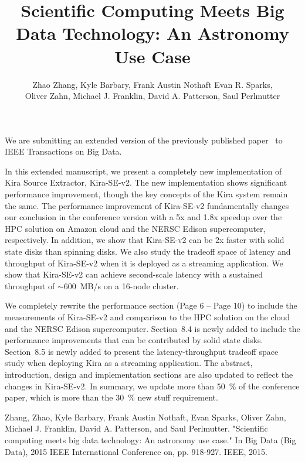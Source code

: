 \documentclass[10pt,a4paper]{article}
\title{Scientific Computing Meets Big Data Technology: An Astronomy Use Case}
\author{Zhao Zhang, Kyle Barbary, Frank Austin Nothaft Evan R. Sparks, \\Oliver Zahn, Michael J. Franklin, David A. Patterson, Saul Perlmutter}
\begin{document}
\maketitle
\noindent We are submitting an extended version of the previously published paper~\cite{lamport94} to IEEE Transactions on Big Data.

In this extended manuscript, we present a completely new implementation of Kira Source Extractor, Kira-SE-v2.
The new implementation shows significant performance improvement, though the key concepts of the Kira system remain the same.
The performance improvement of Kira-SE-v2 fundamentally changes our conclusion in the conference version with 
a 5x and 1.8x speedup over the HPC solution on Amazon cloud and the NERSC Edison supercomputer, respectively.
In addition, we show that Kira-SE-v2 can be 2x faster with solid state disks than spinning disks.
We also study the tradeoff space of latency and throughput of Kira-SE-v2 when it is deployed as a streaming application.
We show that Kira-SE-v2 can achieve second-scale latency with a sustained throughput of $\sim$600~MB/s on a 16-node cluster.

We completely rewrite the performance section (Page 6 -- Page 10) to include the measurements of Kira-SE-v2 and comparison
to the HPC solution on the cloud and the NERSC Edison supercomputer.
Section~8.4 is newly added to include the performance improvements that can be contributed by solid state disks.
Section~8.5 is newly added to present the latency-throughput tradeoff space study when deploying Kira as a streaming application.
The abstract, introduction, design and implementation sections are also updated to reflect the changes in Kira-SE-v2.
In summary, we update more than 50~\% of the conference paper, which is more than the 30~\% new stuff requirement.


\begin{thebibliography}{1}

Zhang, Zhao, Kyle Barbary, Frank Austin Nothaft, Evan Sparks, Oliver Zahn, Michael J. Franklin, David A. Patterson, and Saul Perlmutter. "Scientific computing meets big data technology: An astronomy use case." In Big Data (Big Data), 2015 IEEE International Conference on, pp. 918-927. IEEE, 2015.
\end{thebibliography}
\end{document}
